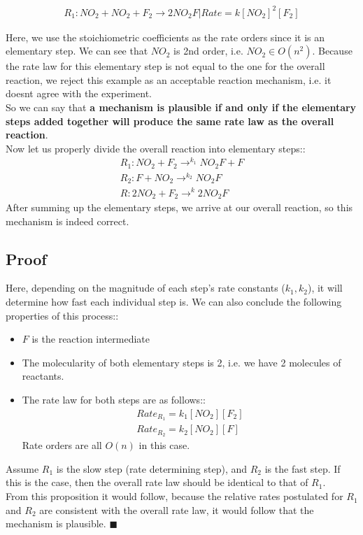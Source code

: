 \documentclass[12pt]{book}
\begin{document}
\begin{align}
    R_1:NO_2+NO_2+F_2\rightarrow 2NO_2F|Rate=k[NO_2]^2[F_2]
\end{align}

Here, we use the stoichiometric coefficients as the rate orders since it is an elementary step. We can see that $NO_2$ is 2nd order, i.e. $NO_2\in O(n^2)$. Because the rate law for this elementary step is not equal to the one for the overall reaction, we reject this example as an acceptable reaction mechanism, i.e. it doesnt agree with the experiment.\\So we can say that \textbf{a mechanism is plausible if and only if the elementary steps added together will produce the same rate law as the overall reaction}.\\

Now let us properly divide the overall reaction into elementary steps::
\begin{align}
    R_1:NO_2+F_2\rightarrow^{k_1} NO_2F+F\\
    R_2:F+NO_2\rightarrow^{k_2} NO_2F\\
    R:2NO_2+F_2\rightarrow^k 2NO_2F
\end{align}
After summing up the elementary steps, we arrive at our overall reaction, so this mechanism is indeed correct.

\subsection*{Proof}
Here, depending on the magnitude of each step's rate constants ($k_1,k_2$), it will determine how fast each individual step is. We can also conclude the following properties of this process::

\begin{itemize}
    \item $F$ is the reaction intermediate
    \item The molecularity of both elementary steps is 2, i.e. we have 2 molecules of reactants.
    \item The rate law for both steps are as follows::
    \begin{align}
        Rate_{R_1}=k_1[NO_2][F_2]\\
        Rate_{R_2}=k_2[NO_2][F]
    \end{align}
    Rate orders are all $O(n)$ in this case.
\end{itemize}

Assume $R_1$ is the slow step (rate determining step), and $R_2$ is the fast step. If this is the case, then the overall rate law should be identical to that of $R_1$.\\From this proposition it would follow, because the relative rates postulated for $R_1$ and $R_2$ are consistent with the overall rate law, it would follow that the mechanism is plausible. $\blacksquare$
\end{document}
